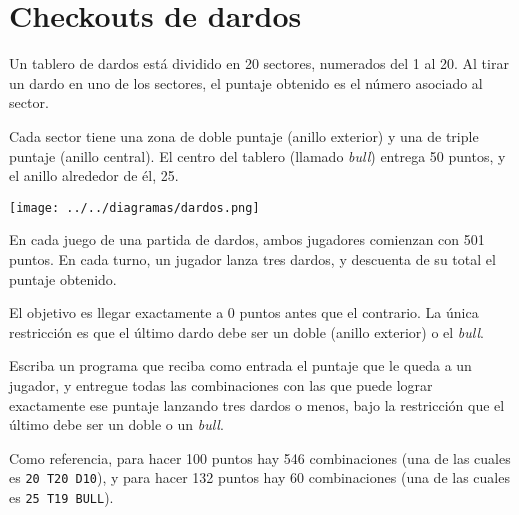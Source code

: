 \section{Checkouts de dardos}

Un tablero de dardos está dividido en 20 sectores, numerados del 1 al
20. Al tirar un dardo en uno de los sectores, el puntaje obtenido es el
número asociado al sector.

Cada sector tiene una zona de doble puntaje (anillo exterior) y una de
triple puntaje (anillo central). El centro del tablero (llamado
\emph{bull}) entrega 50 puntos, y el anillo alrededor de él, 25.

\texttt{[image: ../../diagramas/dardos.png]}

En cada juego de una partida de dardos, ambos jugadores comienzan con
501 puntos. En cada turno, un jugador lanza tres dardos, y descuenta de
su total el puntaje obtenido.

El objetivo es llegar exactamente a 0 puntos antes que el contrario. La
única restricción es que el último dardo debe ser un doble (anillo
exterior) o el \emph{bull}.

Escriba un programa que reciba como entrada el puntaje que le queda a un
jugador, y entregue todas las combinaciones con las que puede lograr
exactamente ese puntaje lanzando tres dardos o menos, bajo la
restricción que el último debe ser un doble o un \emph{bull}.

Como referencia, para hacer 100 puntos hay 546 combinaciones (una de las
cuales es \lstinline!20 T20 D10!), y para hacer 132 puntos hay 60
combinaciones (una de las cuales es \lstinline!25 T19 BULL!).
